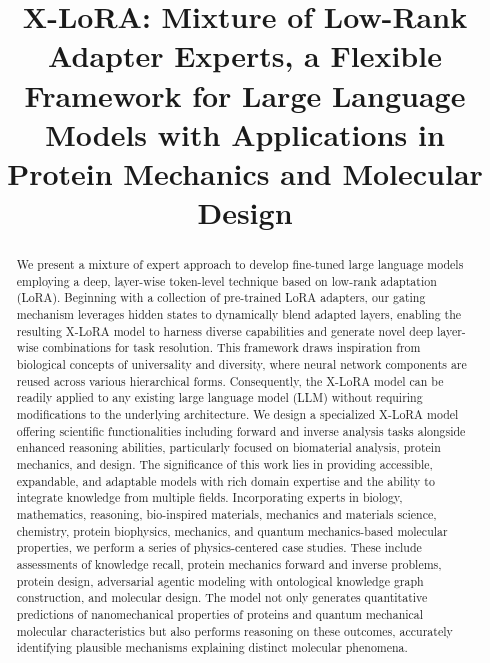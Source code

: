 \title{X-LoRA: Mixture of Low-Rank Adapter Experts, a Flexible Framework for Large Language Models with Applications in Protein Mechanics and Molecular Design}

\begin{abstract}
We present a mixture of expert approach to develop fine-tuned large language models employing a deep, layer-wise token-level technique based on low-rank adaptation (LoRA). Beginning with a collection of pre-trained LoRA adapters, our gating mechanism leverages hidden states to dynamically blend adapted layers, enabling the resulting X-LoRA model to harness diverse capabilities and generate novel deep layer-wise combinations for task resolution. This framework draws inspiration from biological concepts of universality and diversity, where neural network components are reused across various hierarchical forms. Consequently, the X-LoRA model can be readily applied to any existing large language model (LLM) without requiring modifications to the underlying architecture. We design a specialized X-LoRA model offering scientific functionalities including forward and inverse analysis tasks alongside enhanced reasoning abilities, particularly focused on biomaterial analysis, protein mechanics, and design. The significance of this work lies in providing accessible, expandable, and adaptable models with rich domain expertise and the ability to integrate knowledge from multiple fields. Incorporating experts in biology, mathematics, reasoning, bio-inspired materials, mechanics and materials science, chemistry, protein biophysics, mechanics, and quantum mechanics-based molecular properties, we perform a series of physics-centered case studies. These include assessments of knowledge recall, protein mechanics forward and inverse problems, protein design, adversarial agentic modeling with ontological knowledge graph construction, and molecular design. The model not only generates quantitative predictions of nanomechanical properties of proteins and quantum mechanical molecular characteristics but also performs reasoning on these outcomes, accurately identifying plausible mechanisms explaining distinct molecular phenomena.
\end{abstract}

